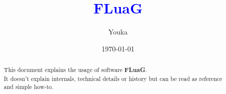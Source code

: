 \documentclass[12pt,a4paper,notitlepage,onecolumn,oneside]{article}
\title{\textcolor{blue}{FLuaG}}
\author{Youka}
\date{\today}
\begin{document}
\maketitle
\vfill
\tableofcontents
\newpage
\begin{abstract}
This document explains the usage of software \textbf{FLuaG}.\\
It doesn't explain internals, technical details or history but can be read as reference and simple how-to.
\end{abstract}
\newpage


\end{document}
